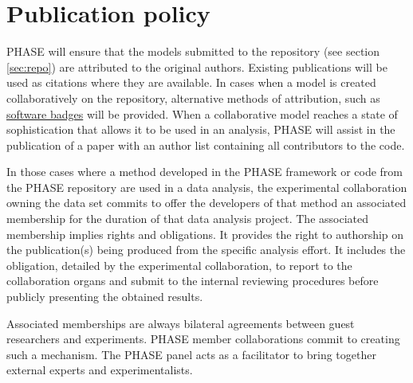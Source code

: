 \section{Publication policy}
PHASE will ensure that the models submitted to the repository (see section \ref{sec:repo}) are attributed to the original authors. Existing publications will be used as citations where they are available. In cases when a model is created collaboratively on the repository, alternative methods of attribution, such as \href{http://openbadges.org}{software badges} will be provided. When a collaborative model reaches a state of sophistication that allows it to be used in an analysis, PHASE will assist in the publication of a paper with an author list containing all contributors to the code.

In those cases where a method developed in the PHASE framework or code from the PHASE repository are used in a data analysis, the experimental collaboration owning the data set commits to offer the developers of that method an associated membership for the duration of that data analysis project. The associated membership implies rights and obligations. It provides the right to authorship on the publication(s) being produced from the specific analysis effort. It includes the obligation, detailed by the experimental collaboration, to report to the collaboration organs and submit to the internal reviewing procedures before publicly presenting the obtained results. 

Associated memberships are always bilateral agreements between guest researchers and experiments. PHASE member collaborations commit to creating such a mechanism. The PHASE panel acts as a facilitator to bring together external experts and experimentalists.